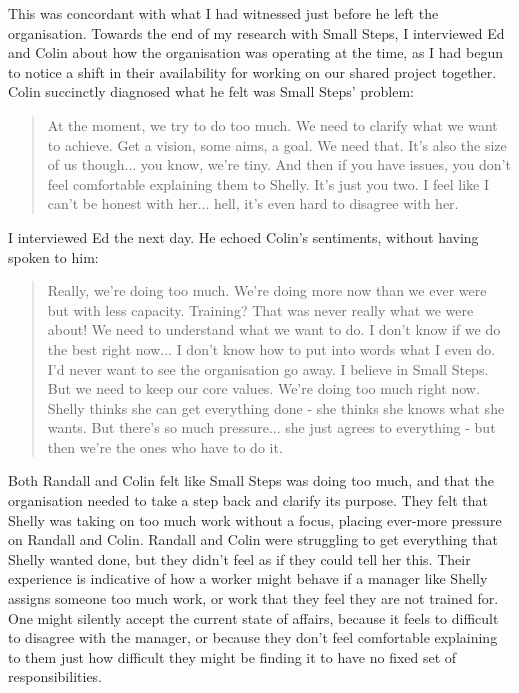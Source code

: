 This was concordant with what I had witnessed just before he left the organisation. Towards the end of my research with Small Steps, I interviewed Ed and Colin about how the organisation was operating at the time, as I had begun to notice a shift in their availability for working on our shared project together. Colin succinctly diagnosed what he felt was Small Steps’ problem:
\begin{quote}
At the moment, we try to do too much. We need to clarify what we want to achieve. Get a vision, some aims, a goal. We need that. It's also the size of us though... you know, we're tiny. And then if you have issues, you don't feel comfortable explaining them to Shelly. It's just you two. I feel like I can't be honest with her... hell, it's even hard to disagree with her.
\end{quote}
I interviewed Ed the next day. He echoed Colin’s sentiments, without having spoken to him:
\begin{quote}
Really, we're doing too much. We're doing more now than we ever were but with less capacity. Training? That was never really what we were about! We need to understand what we want to do. I don't know if we do the best right now... I don't know how to put into words what I even do. I'd never want to see the organisation go away. I believe in Small Steps. But we need to keep our core values. We're doing too much right now. Shelly thinks she can get everything done - she thinks she knows what she wants. But there's so much pressure... she just agrees to everything - but then we're the ones who have to do it.
\end{quote}
Both Randall and Colin felt like Small Steps was doing too much, and that the organisation needed to take a step back and clarify its purpose. They felt that Shelly was taking on too much work without a focus, placing ever-more pressure on Randall and Colin. Randall and Colin were struggling to get everything that Shelly wanted done, but they didn't feel as if they could tell her this. Their experience is indicative of how a worker might behave if a manager like Shelly assigns someone too much work, or work that they feel they are not trained for. One might silently accept the current state of affairs, because it feels to difficult to disagree with the manager, or because they don't feel comfortable explaining to them just how difficult they might be finding it to have no fixed set of responsibilities.  

